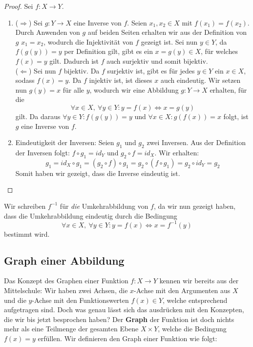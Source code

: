 \begin{proof} \label{prf_inverse_of_fcn} Sei $f: X \to Y$.
\begin{enumerate}
    \item ($\Longrightarrow$) Sei $g: Y \to X$ eine Inverse von $f$. Seien $x_1, x_2 \in X$ mit $f(x_1) = f(x_2)$. Durch Anwenden von $g$ auf beiden Seiten erhalten wir aus der Definition von $g$ $x_1 = x_2$, wodurch die Injektivität von $f$ gezeigt ist. Sei nun $y \in Y$, da $f(g(y)) = y$ per Definition gilt, gibt es ein $x=g(y)\in X$, für welches $f(x) =y$ gilt. Dadurch ist $f$ auch surjektiv und somit bijektiv.\\
    ($\Longleftarrow$) Sei nun $f$ bijektiv. Da $f$ surjektiv ist, gibt es für jedes $y \in Y$ ein $x\in X$, sodass $f(x) = y$. Da $f$ injektiv ist, ist dieses $x$ auch eindeutig. Wir setzen nun $g(y) = x$ für alle $y$, wodurch wir eine Abbildung $g: Y \to X$ erhalten, für die $$\forall x \in X, \ \forall y \in Y: y = f(x) \iff x = g(y)$$ gilt. Da daraus $\forall y \in Y: f(g(y)) = y$ und $\forall x \in X: g(f(x)) = x$ folgt, ist $g$ eine Inverse von $f$.
    \item Eindeutigkeit der Inversen: Seien $g_1$ und $g_2$ zwei Inversen. Aus der Definition der Inversen folgt: $f\circ g_1 = id_Y$ und $g_2 \circ f = id_X$. Wir erhalten:
    $$g_1 = id_X \circ g_1 = (g_2 \circ f)\circ g_1 = g_2 \circ (f \circ g_1) = g_2 \circ id_Y = g_2 $$
    Somit haben wir gezeigt, dass die Inverse eindeutig ist.
\end{enumerate}
\end{proof}

Wir schreiben $f^{-1}$ für \textit{die} Umkehrabbildung von $f$, da wir nun gezeigt haben, dass die Umkehrabbildung eindeutig durch die Bedingung $$\forall x \in X, \ \forall y \in Y: y = f(x) \iff x = f^{-1}(y)$$ bestimmt wird.

\subsection{Graph einer Abbildung}
Das Konzept des Graphen einer Funktion $f: X \to Y$ kennen wir bereits aus der Mittelschule: Wir haben zwei Achsen, die $x$-Achse mit den Argumenten aus $X$ und die $y$-Achse mit den Funktionswerten $f(x) \in Y$, welche entsprechend aufgetragen sind. Doch was genau lässt sich das ausdrücken mit den Konzepten, die wir bis jetzt besprochen haben? Der \textbf{Graph} der Funktion ist doch nichts mehr als eine Teilmenge der gesamten Ebene $X \times Y$, welche die Bedingung $f(x) = y$ erfüllen. Wir definieren den Graph einer Funktion wie folgt:

